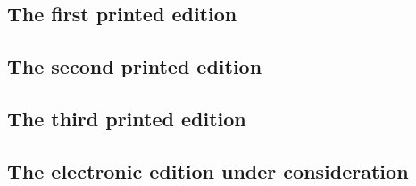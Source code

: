 \documentclass{mwart}
\begin{document}
\subsection{The first printed edition}
\label{sec:first-print-edit}

\subsection{The second printed edition}
\label{sec:second-print-edit}

\subsection{The third printed edition}
\label{sec:third-print-edit}

\subsection{The electronic edition under consideration}
\label{sec:electr-edit-under}



\end{document}
